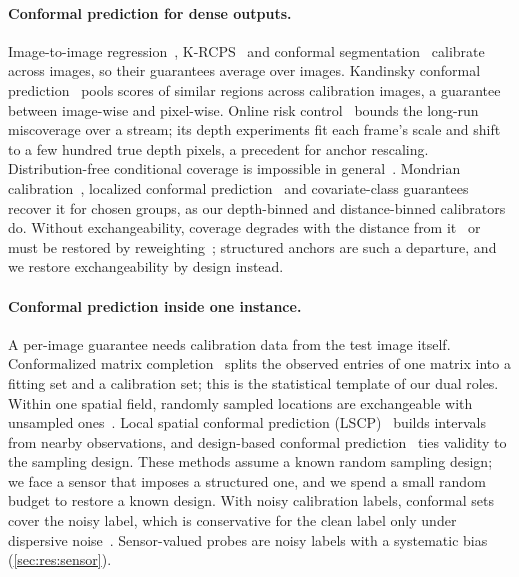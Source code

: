 \paragraph{Conformal prediction for dense outputs.}
Image-to-image regression~\cite{angelopoulos2022im2im}, K-RCPS~\cite{teneggi2023krcps} and conformal segmentation~\cite{mossina2024segmentation} calibrate across images, so their guarantees average over images.
Kandinsky conformal prediction~\cite{brunekreef2024kandinsky,bairaktari2025kandinsky} pools scores of similar regions across calibration images, a guarantee between image-wise and pixel-wise.
Online risk control~\cite{feldman2023onlinerisk} bounds the long-run miscoverage over a stream; its depth experiments fit each frame's scale and shift to a few hundred true depth pixels, a precedent for anchor rescaling.
Distribution-free conditional coverage is impossible in general~\cite{vovk2012conditional,barber2021limits}.
Mondrian calibration~\cite{vovk2005alrw}, localized conformal prediction~\cite{guan2023localized} and covariate-class guarantees~\cite{gibbs2023conditional} recover it for chosen groups, as our depth-binned and distance-binned calibrators do.
Without exchangeability, coverage degrades with the distance from it~\cite{barber2023beyond} or must be restored by reweighting~\cite{tibshirani2019covshift}; structured anchors are such a departure, and we restore exchangeability by design instead.

\paragraph{Conformal prediction inside one instance.}
A per-image guarantee needs calibration data from the test image itself.
Conformalized matrix completion~\cite{gui2023cmc} splits the observed entries of one matrix into a fitting set and a calibration set; this is the statistical template of our dual roles.
Within one spatial field, randomly sampled locations are exchangeable with unsampled ones~\cite{mao2024spatial}.
Local spatial conformal prediction (LSCP)~\cite{jiang2024lscp} builds intervals from nearby observations, and design-based conformal prediction~\cite{wieczorek2023design} ties validity to the sampling design.
These methods assume a known random sampling design; we face a sensor that imposes a structured one, and we spend a small random budget to restore a known design.
With noisy calibration labels, conformal sets cover the noisy label, which is conservative for the clean label only under dispersive noise~\cite{einbinder2024labelnoise}.
Sensor-valued probes are noisy labels with a systematic bias (\cref{sec:res:sensor}).

